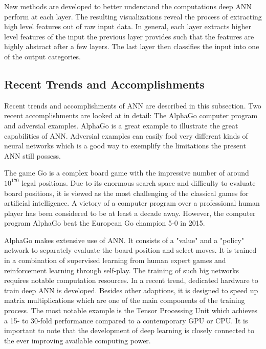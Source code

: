New methods are developed to better understand the computations deep ANN perform at each layer. The resulting visualizations reveal the process of extracting high level features out of raw input data\cite{mordvintsev2015}\cite{yosinski2015understanding}. In general, each layer extracts higher level features of the input the previous layer provides such that the features are highly abstract after a few layers. The last layer then classifies the input into one of the output categories.

\subsection{Recent Trends and Accomplishments}\label{subsec:trends}
\label{sec:Recent_trends}

Recent trends and accomplishments of ANN are described in this subsection. Two recent accomplishments are looked at in detail: The AlphaGo computer program and adversial examples. AlphaGo is a great example to illustrate the great capabilities of ANN. Adversial examples can easily fool very different kinds of neural networks which is a good way to exemplify the limitations the present ANN still possess.

The game Go is a complex board game with the impressive number of around $10^{170}$ legal positions\cite{tromp2006combinatorics}. Due to its enormous search space and difficulty to evaluate board positions, it is viewed as the most challenging of the classical games for artificial intelligence. A victory of a computer program over a professional human player has been considered to be at least a decade away. However, the computer program AlphaGo beat the European Go champion 5-0 in 2015\cite{silver2016mastering}.

AlphaGo makes extensive use of ANN. It consists of a "value" and a "policy" network to separately evaluate the board position and select moves. It is trained in a combination of supervised learning from human expert games and reinforcement learning through self-play. The training of such big networks requires notable computation resources. In a recent trend, dedicated hardware to train deep ANN is developed. Besides other adaptions, it is designed to speed up matrix multiplications which are one of the main components of the training process. The most notable example is the Tensor Processing Unit which achieves a 15- to 30-fold performance compared to a contemporary GPU or CPU\cite{jouppi2017datacenter}. It is important to note that the development of deep learning is closely connected to the ever improving available computing power\cite{chen2016evolution}.

